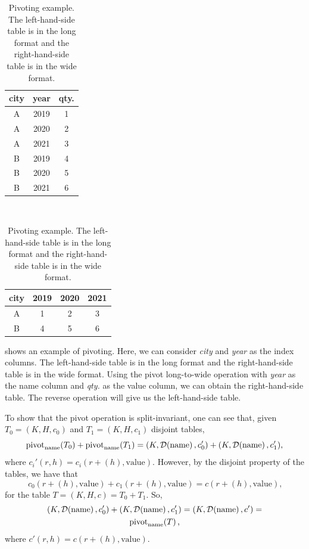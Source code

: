 \begin{table}
    \centering
    \begin{tabular}{ccc}
      \toprule
      \textbf{city} & \textbf{year} & \textbf{qty.} \\
      \midrule
      A & 2019 & 1 \\
      A & 2020 & 2 \\
      A & 2021 & 3 \\
      B & 2019 & 4 \\
      B & 2020 & 5 \\
      B & 2021 & 6 \\
      \bottomrule
    \end{tabular}
    ~
    \begin{tabular}{cccc}
      \toprule
      \textbf{city} & \textbf{2019} & \textbf{2020} & \textbf{2021} \\
      \midrule
      A & 1 & 2 & 3 \\
      B & 4 & 5 & 6 \\
      \bottomrule
    \end{tabular}
  \caption{
  Pivoting example.
  The left-hand-side table is in the long format and the right-hand-side table is in the
  wide format.
  }
  \label{tab:pivot}
\end{table}

 shows an example of pivoting.  Here, we can consider \emph{city} and
\emph{year} as the index columns.  The left-hand-side table is in the long format and the
right-hand-side table is in the wide format.  Using the pivot long-to-wide operation with
\emph{year} as the name column and \emph{qty.} as the value column, we can obtain the
right-hand-side table.  The reverse operation will give us the left-hand-side table.

To show that the pivot operation is split-invariant, one can see that, given
$T_0 = (K, H, c_0)$ and $T_1 = (K, H, c_1)$ disjoint tables,
\[
  \operatorname{pivot}_\text{name}\!\left(T_0\right) + \operatorname{pivot}_\text{name}\!\left(T_1\right) = \\
    (K, \mathcal{D}\!\left(\text{name}\right), c_0') + (K, \mathcal{D}\!\left(\text{name}\right), c_1')\text{,}
\] where $c_i'(r, h) = c_i(r + (h), \text{value})$.  However, by the disjoint property of
the tables, we have that \[
  c_0(r + (h), \text{value}) + c_1(r + (h), \text{value}) = c(r + (h), \text{value})\text{,}
\] for the table $T = (K, H, c) = T_0 + T_1$. So,
\begin{multline*}
  (K, \mathcal{D}\!\left(\text{name}\right), c_0') + (K, \mathcal{D}\!\left(\text{name}\right), c_1') =
    (K, \mathcal{D}\!\left(\text{name}\right), c') =\\
    \operatorname{pivot}_\text{name}\!\left(T\right)\text{,}
\end{multline*}
where $c'(r, h) = c(r + (h), \text{value})$.

